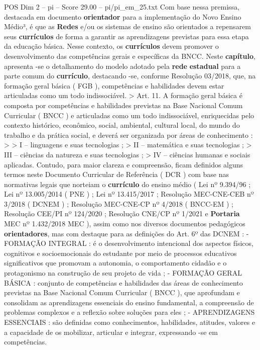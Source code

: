 \begin{textsample}{POS Dim 2 – pi – Score 29.00 – pi/pi\_em\_25.txt}
Com base nessa premissa, destacada em documento \textbf{orientador} para a implementação do Novo Ensino Médio³, é que as \textbf{Redes} e/ou os sistemas de ensino são orientados a repensarem seus \textbf{currículos} de forma a garantir as aprendizagens previstas para essa etapa da educação básica.
Nesse contexto, os \textbf{currículos} devem promover o desenvolvimento das competências gerais e específicas da BNCC.
Neste \textbf{capítulo}, apresenta -se o detalhamento do modelo adotado pela \textbf{rede} \textbf{estadual} para a parte comum do \textbf{currículo}, destacando -se, conforme Resolução 03/2018, que, na formação geral básica ( FGB ), competências e habilidades devem estar articuladas como um todo indissociável. > Art. 11.
A formação geral básica é composta por competências e habilidades previstas na Base Nacional Comum Curricular ( BNCC ) e articuladas como um todo indissociável, enriquecidas pelo contexto histórico, econômico, social, ambiental, cultural local, do mundo do trabalho e da prática social, e deverá ser organizada por áreas de conhecimento : > > I – linguagens e suas tecnologias ; > II – matemática e suas tecnologias ; > III – ciências da natureza e suas tecnologias ; > IV – ciências humanas e sociais aplicadas.
Contudo, para maior clareza e compreensão, ficam definidos alguns termos neste Documento Curricular de Referência ( DCR ) com base nas normativas legais que norteiam o \textbf{currículo} do ensino médio ( Lei nº 9.394/96 ; Lei nº 13.005/2014 ( PNE ) ; Lei nº 13.415/2017 ; Resolução MEC-CNE-CEB nº 3/2018 ( DCNEM ) ; Resolução MEC-CNE-CP nº 4/2018 ( BNCC-EM ) ; Resolução CEE/PI nº 124/2020 ; Resolução CNE/CP nº 1/2021 e \textbf{Portaria} MEC nº 1.432/2018 MEC ), assim como nos diversos documentos pedagógicos \textbf{orientadores}, mas com destaque para as definições do Art. 6º das DCNEM : - FORMAÇÃO INTEGRAL : é o desenvolvimento intencional dos aspectos físicos, cognitivos e socioemocionais do estudante por meio de processos educativos significativos que promovam a autonomia, o comportamento cidadão e o protagonismo na construção de seu projeto de vida ; - FORMAÇÃO GERAL BÁSICA : conjunto de competências e habilidades das áreas de conhecimento previstas na Base Nacional Comum Curricular ( BNCC ), que aprofundam e consolidam as aprendizagens essenciais do ensino fundamental, a compreensão de problemas complexos e a reflexão sobre soluções para eles ; - APRENDIZAGENS ESSENCIAIS : são definidas como conhecimentos, habilidades, atitudes, valores e a capacidade de os mobilizar, articular e integrar, expressando -se em competências.

\end{textsample}
